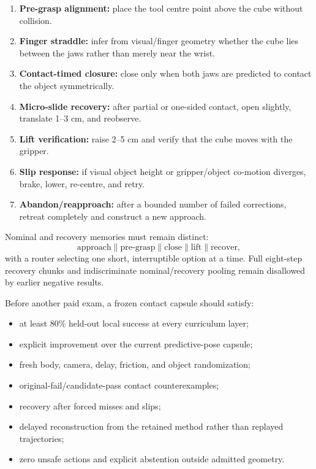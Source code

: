 \documentclass[11pt,a4paper]{article}
\begin{document}
\begin{enumerate}
\item \textbf{Pre-grasp alignment:} place the tool centre point above the cube
without collision.
\item \textbf{Finger straddle:} infer from visual/finger geometry whether the
cube lies between the jaws rather than merely near the wrist.
\item \textbf{Contact-timed closure:} close only when both jaws are predicted
to contact the object symmetrically.
\item \textbf{Micro-slide recovery:} after partial or one-sided contact, open
slightly, translate 1--3 cm, and reobserve.
\item \textbf{Lift verification:} raise 2--5 cm and verify that the cube moves
with the gripper.
\item \textbf{Slip response:} if visual object height or gripper/object
co-motion diverges, brake, lower, re-centre, and retry.
\item \textbf{Abandon/reapproach:} after a bounded number of failed corrections,
retreat completely and construct a new approach.
\end{enumerate}

Nominal and recovery memories must remain distinct:
\begin{equation}
\text{approach}\parallel\text{pre-grasp}\parallel\text{close}
\parallel\text{lift}\parallel\text{recover},
\end{equation}
with a router selecting one short, interruptible option at a time.  Full
eight-step recovery chunks and indiscriminate nominal/recovery pooling remain
disallowed by earlier negative results.

Before another paid exam, a frozen contact capsule should satisfy:
\begin{itemize}
\item at least 80\% held-out local success at every curriculum layer;
\item explicit improvement over the current predictive-pose capsule;
\item fresh body, camera, delay, friction, and object randomization;
\item original-fail/candidate-pass contact counterexamples;
\item recovery after forced misses and slips;
\item delayed reconstruction from the retained method rather than replayed
trajectories;
\item zero unsafe actions and explicit abstention outside admitted geometry.
\end{itemize}
\end{document}
